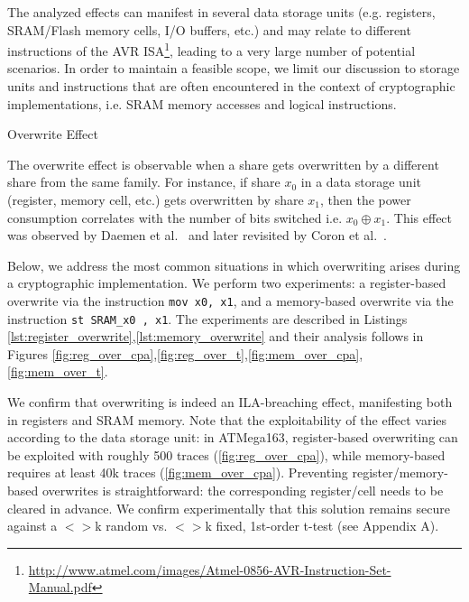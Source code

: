 The analyzed effects can manifest in several data storage units (e.g. registers, SRAM/Flash memory cells, I/O buffers, etc.) and may relate to different instructions of the AVR ISA\footnote{\url{http://www.atmel.com/images/Atmel-0856-AVR-Instruction-Set-Manual.pdf}}, leading to a very large number of potential scenarios. In order to maintain a feasible scope, we limit our discussion to storage units and instructions that are often encountered in the context of cryptographic implementations, i.e. SRAM memory accesses and logical instructions.
\begin{subsection}{Overwrite Effect}\label{overwrite}

The overwrite effect is observable when a share gets overwritten by a different share from the same family. For instance, if share $x_0$ in a data storage unit (register, memory cell, etc.) gets overwritten by share $x_1$, then the power consumption correlates with the number of bits switched i.e. $x_0 \oplus x_1$. This effect was observed by Daemen et al.~\cite{noteonsca} and later revisited by Coron et al.~\cite{DBLP:conf/cosade/CoronGPRRV12}.

Below, we address the most common situations in which overwriting arises during a cryptographic implementation. We perform two experiments: a register-based overwrite via the instruction \texttt{mov x0, x1}, and a memory-based overwrite via the instruction \texttt{st SRAM\_x0 ,  x1}. The experiments are described in Listings \ref{lst:register_overwrite},\ref{lst:memory_overwrite} and their analysis follows in Figures \ref{fig:reg_over_cpa},\ref{fig:reg_over_t},\ref{fig:mem_over_cpa},\ref{fig:mem_over_t}.

We confirm that overwriting is indeed an ILA-breaching effect, manifesting both in registers and SRAM memory. Note that the exploitability of the effect varies according to the data storage unit: in ATMega163, register-based overwriting can be exploited with roughly 500 traces (\ref{fig:reg_over_cpa}), while memory-based requires at least 40k traces (\ref{fig:mem_over_cpa}). Preventing register/memory-based overwrites is straightforward: the corresponding register/cell needs to be cleared in advance. We confirm experimentally that this solution remains secure against a $<>$k random vs. $<>$k fixed, 1st-order t-test (see Appendix A).


\end{subsection}
